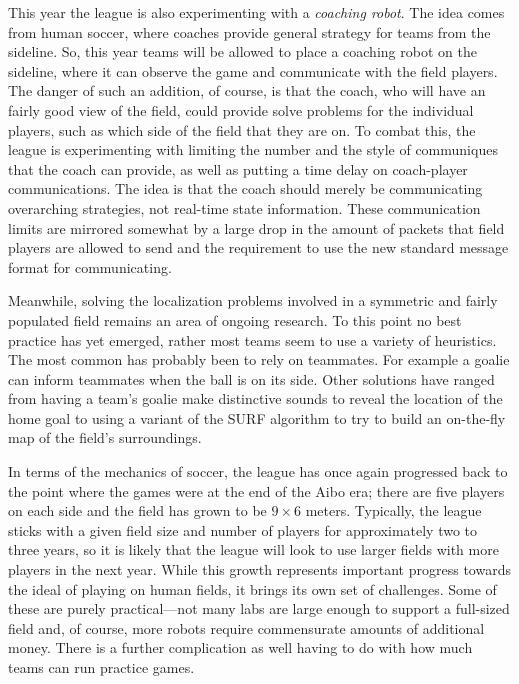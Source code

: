 \documentclass{llncs}
\begin{document}
This year the league is also experimenting with a \textit{coaching robot}. The
idea comes from human soccer, where coaches provide general strategy
for teams from the sideline. So, this year teams will be allowed to place
a coaching robot on the sideline, where it can observe the game and communicate with the field players. The
danger of such an addition, of course, is that the coach, who will have an
fairly good view of the field, could provide solve
problems for the individual players, such as which side of the field
that they are on. To combat this, the league is experimenting with limiting
the number and the style of communiques that the coach can provide, 
as well as putting a time delay on coach-player communications.
The idea is that the coach should merely be communicating overarching
strategies, not real-time state information. 
These communication limits are mirrored somewhat by a large drop in
the amount of packets that field players are allowed to send
and the requirement to use the new standard message format for communicating.

Meanwhile, solving the localization problems involved in a symmetric 
and fairly populated 
field remains an area of ongoing research. To this point no best
practice has yet emerged, rather most teams seem to use a variety of
heuristics. The most common has probably been to rely on teammates. For
example a goalie can inform teammates when the ball is on its side.
Other solutions have ranged from having a team's goalie make
distinctive sounds to reveal the location of the home goal to using a variant of the SURF algorithm to try
to build an on-the-fly map of the field's surroundings.

In terms of the mechanics of soccer, the league has once again progressed
back to the point where the games were at
the end of the Aibo era; there are five players on each side and the field has grown to be $9\times 6$ meters. Typically,
the league sticks with a given field size and number of
players for approximately two to three years, so it is likely that the league
will look to use larger fields with more players in the next year. While this
growth represents important progress towards the ideal of playing
on human fields, it brings its own set of challenges. Some of these are
purely practical---not many labs are large enough to support a full-sized
field and, of course, more robots require commensurate amounts of additional
money. There is a further complication as well having to do with how
much teams can run practice games. 
\end{document}
